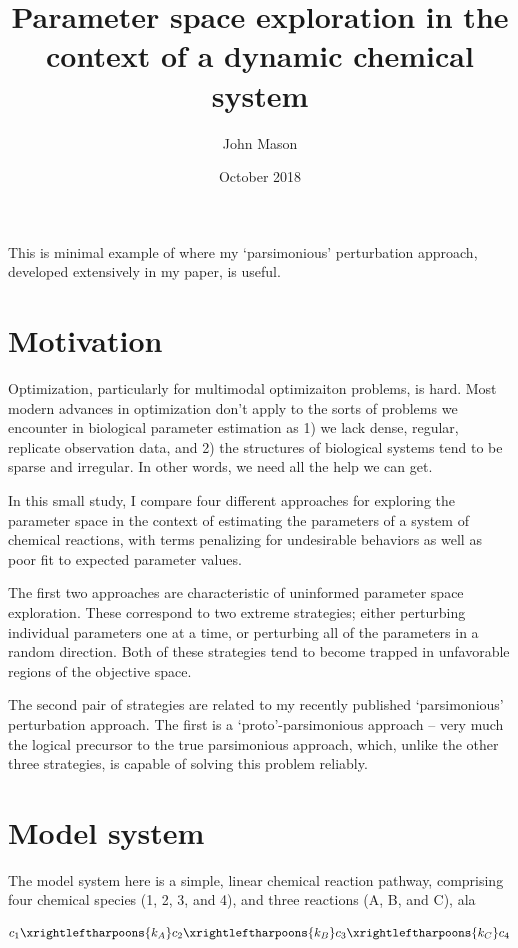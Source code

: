 \documentclass{article}
\title{Parameter space exploration in the context of a dynamic chemical system}
\author{John Mason}
\date{October 2018}
\begin{document}
\maketitle

This is minimal example of where my `parsimonious' perturbation approach, developed extensively in my paper, is useful.

\section{Motivation}

Optimization, particularly for multimodal optimizaiton problems, is hard.  Most modern advances in optimization don't apply to the sorts of problems we encounter in biological parameter estimation as 1) we lack dense, regular, replicate observation data, and 2) the structures of biological systems tend to be sparse and irregular.  In other words, we need all the help we can get.

In this small study, I compare four different approaches for exploring the parameter space in the context of estimating the parameters of a system of chemical reactions, with terms penalizing for undesirable behaviors as well as poor fit to expected parameter values.

The first two approaches are characteristic of uninformed parameter space exploration.  These correspond to two extreme strategies; either perturbing individual parameters one at a time, or perturbing all of the parameters in a random direction.  Both of these strategies tend to become trapped in unfavorable regions of the objective space.

The second pair of strategies are related to my recently published `parsimonious' perturbation approach.  The first is a `proto'-parsimonious approach -- very much the logical precursor to the true parsimonious approach, which, unlike the other three strategies, is capable of solving this problem reliably.

\section{Model system}

The model system here is a simple, linear chemical reaction pathway, comprising four chemical species (1, 2, 3, and 4), and three reactions (A, B, and C), ala

\begin{align}
c_1 \xrightleftharpoons{k_A} c_2 \xrightleftharpoons{k_B} c_3 \xrightleftharpoons{k_C} c_4
\end{align}
\end{document}
